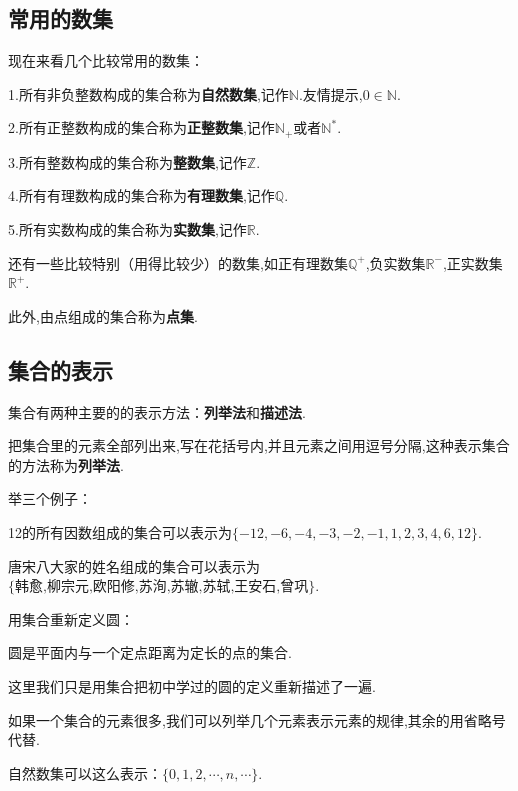 \documentclass[lang=cn,math=cm,chinesefont=nofont,11pt,scheme=chinese,twocol]{elegantbook}
\begin{document}
\subsection{常用的数集}
现在来看几个比较常用的数集：

1.所有非负整数构成的集合称为\textbf{自然数集},记作$\mathbb{N}$.友情提示,$0\in \mathbb{N}$.

2.所有正整数构成的集合称为\textbf{正整数集},记作$\mathbb{N}_+$或者$\mathbb{N}^*$.

3.所有整数构成的集合称为\textbf{整数集},记作$\mathbb{Z}$.

4.所有有理数构成的集合称为\textbf{有理数集},记作$\mathbb{Q}$.

5.所有实数构成的集合称为\textbf{实数集},记作$\mathbb{R}$.

还有一些比较特别（用得比较少）的数集,如正有理数集$\mathbb{Q}^+$,负实数集$\mathbb{R}^-$,正实数集$\mathbb{R}^+$.

此外,由点组成的集合称为\textbf{点集}.

\subsection{集合的表示}
集合有两种主要的的表示方法：\textbf{列举法}和\textbf{描述法}.

把集合里的元素全部列出来,写在花括号内,并且元素之间用逗号分隔,这种表示集合的方法称为\textbf{列举法}.

举三个例子：

\begin{example}
  12的所有因数组成的集合可以表示为$\{-12,-6,-4,-3,-2,-1,1,2,3,4,6,12\}$.
\end{example}
\begin{example}
  唐宋八大家的姓名组成的集合可以表示为$\{\text{韩愈,柳宗元,欧阳修,苏洵,苏辙,苏轼,王安石,曾巩}\}$.
\end{example}
\begin{example}
  用集合重新定义圆：
\end{example}
\begin{definition}[圆]
  圆是平面内与一个定点距离为定长的点的集合.
\end{definition}
这里我们只是用集合把初中学过的圆的定义重新描述了一遍.

如果一个集合的元素很多,我们可以列举几个元素表示元素的规律,其余的用省略号代替.

\begin{example}
  自然数集可以这么表示：$\{0,1,2,\cdots,n,\cdots\}$.
\end{example}
\end{document}
